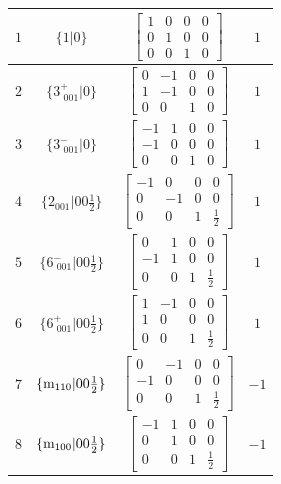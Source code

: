\documentclass[fleqn,8pt]{jsarticle}
\begin{document}
\begin{longtable}{cccc}
$ 1 $ & $ \{1|0\} $ & $ \begin{bmatrix} 1 & 0 & 0 & 0 \\ 0 & 1 & 0 & 0 \\ 0 & 0 & 1 & 0 \end{bmatrix} $ & $ 1 $ \\ \hline
$ 2 $ & $ \{3^{+}_{\,\,001}|0\} $ & $ \begin{bmatrix} 0 & -1 & 0 & 0 \\ 1 & -1 & 0 & 0 \\ 0 & 0 & 1 & 0 \end{bmatrix} $ & $ 1 $ \\ \hline
$ 3 $ & $ \{3^{-}_{\,\,001}|0\} $ & $ \begin{bmatrix} -1 & 1 & 0 & 0 \\ -1 & 0 & 0 & 0 \\ 0 & 0 & 1 & 0 \end{bmatrix} $ & $ 1 $ \\ \hline
$ 4 $ & $ \{2{}_{001}|0 0 \frac{1}{2}\} $ & $ \begin{bmatrix} -1 & 0 & 0 & 0 \\ 0 & -1 & 0 & 0 \\ 0 & 0 & 1 & \frac{1}{2} \end{bmatrix} $ & $ 1 $ \\ \hline
$ 5 $ & $ \{6^{-}_{\,\,001}|0 0 \frac{1}{2}\} $ & $ \begin{bmatrix} 0 & 1 & 0 & 0 \\ -1 & 1 & 0 & 0 \\ 0 & 0 & 1 & \frac{1}{2} \end{bmatrix} $ & $ 1 $ \\ \hline
$ 6 $ & $ \{6^{+}_{\,\,001}|0 0 \frac{1}{2}\} $ & $ \begin{bmatrix} 1 & -1 & 0 & 0 \\ 1 & 0 & 0 & 0 \\ 0 & 0 & 1 & \frac{1}{2} \end{bmatrix} $ & $ 1 $ \\ \hline
$ 7 $ & $ \{{\rm m}_{110}|0 0 \frac{1}{2}\} $ & $ \begin{bmatrix} 0 & -1 & 0 & 0 \\ -1 & 0 & 0 & 0 \\ 0 & 0 & 1 & \frac{1}{2} \end{bmatrix} $ & $ -1 $ \\ \hline
$ 8 $ & $ \{{\rm m}_{100}|0 0 \frac{1}{2}\} $ & $ \begin{bmatrix} -1 & 1 & 0 & 0 \\ 0 & 1 & 0 & 0 \\ 0 & 0 & 1 & \frac{1}{2} \end{bmatrix} $ & $ -1 $ \\ \hline

\end{longtable}
\end{document}
